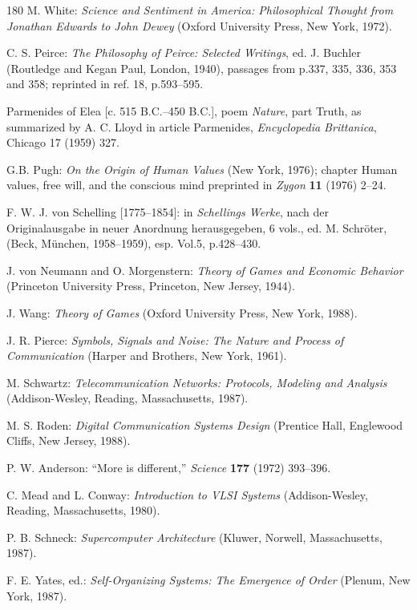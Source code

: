 \documentclass[11pt]{article}
\begin{document}
\begin{thebibliography}{180}
		M. White: \emph{Science and Sentiment in America: Philosophical Thought from Jonathan Edwards to John Dewey} (Oxford University Press, New York, 1972).
		
		C. S. Peirce: \emph{The Philosophy of Peirce: Selected Writings}, ed. J. Buchler (Routledge and Kegan Paul, London, 1940), passages from p.337, 335, 336, 353 and 358; reprinted in ref. 18, p.593--595.
		
		Parmenides of Elea [c. 515 B.C.--450 B.C.], poem \emph{Nature}, part Truth, as summarized by A. C. Lloyd in article Parmenides, \emph{Encyclopedia Brittanica}, Chicago 17 (1959) 327.
		
		G.B. Pugh: \emph{On the Origin of Human Values} (New York, 1976); chapter Human values, free will, and the conscious mind preprinted in \emph{Zygon} \textbf{11} (1976) 2--24.
		
		F. W. J. von Schelling [1775--1854]: in \emph{Schellings Werke}, nach der Originalausgabe in neuer Anordnung herausgegeben, 6 vols., ed. M. Schröter, (Beck, München, 1958--1959), esp. Vol.5, p.428--430.
		
		J. von Neumann and O. Morgenstern: \emph{Theory of Games and Economic Behavior} (Princeton University Press, Princeton, New Jersey, 1944).
		
		J. Wang: \emph{Theory of Games} (Oxford University Press, New York, 1988).
		
		J. R. Pierce: \emph{Symbols, Signals and Noise: The Nature and Process of Communication} (Harper and Brothers, New York, 1961).
		
		M. Schwartz: \emph{Telecommunication Networks: Protocols, Modeling and Analysis} (Addison-Wesley, Reading, Massachusetts, 1987).
		
		M. S. Roden: \emph{Digital Communication Systems Design} (Prentice Hall, Englewood Cliffs, New Jersey, 1988).
		
		P. W. Anderson: ``More is different,'' \emph{Science} \textbf{177} (1972) 393--396.
		
		C. Mead and L. Conway: \emph{Introduction to VLSI Systems} (Addison-Wesley, Reading, Massachusetts, 1980).
		
		P. B. Schneck: \emph{Supercomputer Architecture} (Kluwer, Norwell, Massachusetts, 1987).
		
		F. E. Yates, ed.: \emph{Self-Organizing Systems: The Emergence of Order} (Plenum, New York, 1987).
		

\end{thebibliography}
\end{document}

